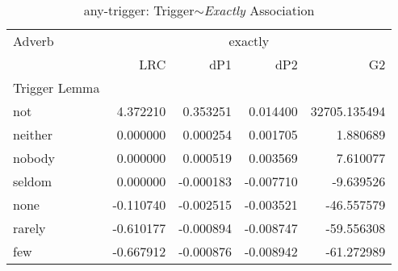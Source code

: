 
\begin{table}[ht]
\caption{any-trigger: Trigger$\sim$\textit{Exactly} Association}
\label{trigger-exactly-AM}
\begin{tabular}{lrrrr}
\toprule
Adverb & \multicolumn{4}{|c|}{exactly} \\
 & LRC & dP1 & dP2 & G2 \\
Trigger Lemma &  &  &  &  \\
\midrule
not & {\cellcolor[HTML]{67001F}} \color[HTML]{F1F1F1} 4.372210 & {\cellcolor[HTML]{67001F}} \color[HTML]{F1F1F1} 0.353251 & {\cellcolor[HTML]{67001F}} \color[HTML]{F1F1F1} 0.014400 & {\cellcolor[HTML]{67001F}} \color[HTML]{F1F1F1} 32705.135494 \\
neither & {\cellcolor[HTML]{FDD9C4}} \color[HTML]{000000} 0.000000 & {\cellcolor[HTML]{3681BA}} \color[HTML]{F1F1F1} 0.000254 & {\cellcolor[HTML]{F2F5F6}} \color[HTML]{000000} 0.001705 & {\cellcolor[HTML]{3480B9}} \color[HTML]{F1F1F1} 1.880689 \\
nobody & {\cellcolor[HTML]{FDD9C4}} \color[HTML]{000000} 0.000000 & {\cellcolor[HTML]{3681BA}} \color[HTML]{F1F1F1} 0.000519 & {\cellcolor[HTML]{FBE6DA}} \color[HTML]{000000} 0.003569 & {\cellcolor[HTML]{3480B9}} \color[HTML]{F1F1F1} 7.610077 \\
seldom & {\cellcolor[HTML]{FDD9C4}} \color[HTML]{000000} 0.000000 & {\cellcolor[HTML]{3681BA}} \color[HTML]{F1F1F1} -0.000183 & {\cellcolor[HTML]{2267AC}} \color[HTML]{F1F1F1} -0.007710 & {\cellcolor[HTML]{3480B9}} \color[HTML]{F1F1F1} -9.639526 \\
none & {\cellcolor[HTML]{FDDDCB}} \color[HTML]{000000} -0.110740 & {\cellcolor[HTML]{337EB8}} \color[HTML]{F1F1F1} -0.002515 & {\cellcolor[HTML]{7EB8D7}} \color[HTML]{000000} -0.003521 & {\cellcolor[HTML]{3480B9}} \color[HTML]{F1F1F1} -46.557579 \\
rarely & {\cellcolor[HTML]{FAE9DF}} \color[HTML]{000000} -0.610177 & {\cellcolor[HTML]{3480B9}} \color[HTML]{F1F1F1} -0.000894 & {\cellcolor[HTML]{175290}} \color[HTML]{F1F1F1} -0.008747 & {\cellcolor[HTML]{337EB8}} \color[HTML]{F1F1F1} -59.556308 \\
few & {\cellcolor[HTML]{F9EBE3}} \color[HTML]{000000} -0.667912 & {\cellcolor[HTML]{3480B9}} \color[HTML]{F1F1F1} -0.000876 & {\cellcolor[HTML]{144E8A}} \color[HTML]{F1F1F1} -0.008942 & {\cellcolor[HTML]{337EB8}} \color[HTML]{F1F1F1} -61.272989 \\

\end{tabular}
\end{table}
